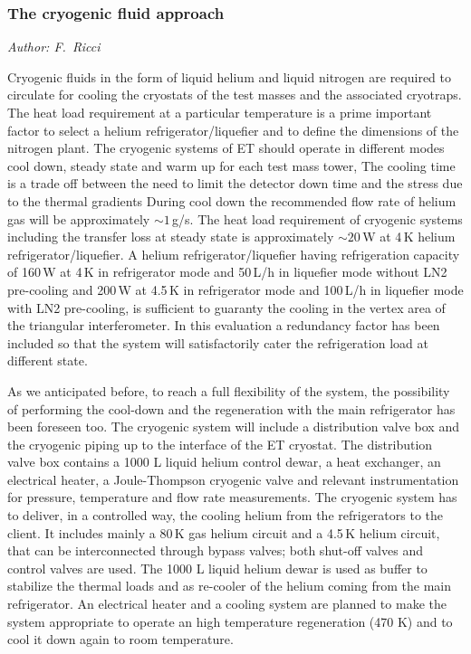  \subsubsection{The cryogenic fluid approach}
 \label{sec:cryofluids}
 \emph{
Author: F.\ Ricci}

Cryogenic  fluids in the form of liquid helium and liquid nitrogen are required to circulate for cooling the cryostats of the test masses and the associated cryotraps. 
The heat load requirement at a particular temperature is a prime important factor to select a helium refrigerator/liquefier and to define the dimensions of the nitrogen plant. The cryogenic systems of ET should operate in different modes cool down, steady state and warm up for each test mass tower,
 The cooling time  is a trade off between the need to limit the detector down  time and the  stress due to the thermal gradients 
 During cool down the recommended  flow rate of helium gas will be approximately  $\sim 1$\,g/s. 
 The heat load requirement of cryogenic systems including the transfer loss at steady state is approximately $\sim 20$\,W at 4\,K helium refrigerator/liquefier. A helium refrigerator/liquefier having refrigeration capacity of 160\,W at 4\,K in refrigerator mode and 50\,L/h in liquefier mode without LN2 pre-cooling and 200\,W at 4.5\,K in refrigerator mode and 100\,L/h in liquefier mode with LN2 pre-cooling, is sufficient to guaranty the cooling in the vertex area of the triangular interferometer. In this evaluation a redundancy factor has been included so that  the system will satisfactorily cater the refrigeration load at different state.

 As we anticipated before, to reach a full flexibility of the system, the possibility of performing the cool-down and the regeneration with the main refrigerator has been foreseen too.
The  cryogenic system  will include a distribution valve box and the cryogenic piping up to the interface of the ET cryostat. The distribution valve box contains a 1000 L liquid helium control dewar, a heat exchanger, an electrical heater, a Joule-Thompson cryogenic valve and relevant instrumentation for pressure, temperature and flow rate measurements.
The cryogenic system  has to deliver, in a controlled way, the cooling helium from the refrigerators to the client. It includes mainly a 80\,K gas helium circuit and a 4.5\,K  helium circuit, that can be interconnected through bypass valves; both shut-off valves and control valves are used. The 1000 L liquid helium dewar is used as buffer to stabilize the thermal loads and as re-cooler of the  helium coming from the main refrigerator.  An electrical heater and a cooling system are planned to make the system appropriate to operate an high temperature regeneration (470 K) and to cool it down again to room temperature.

